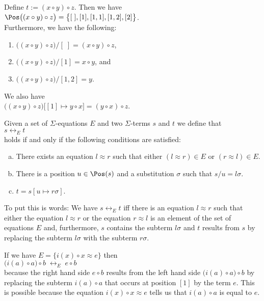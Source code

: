 \example
Define $t := (x \circ y) \circ z$.  Then we have
\\[0.2cm]
\hspace*{1.3cm}
$\Pos\bigl((x \circ y) \circ z\bigr) = \bigl\{ [\;], [1], [1,1], [1,2], [2]\bigr\}$.
\\[0.2cm]
Furthermore, we have the following:
\begin{enumerate}

\item $\bigl((x \circ y) \circ z\bigr)/[\;] = (x \circ y) \circ z$,
\item $\bigl((x \circ y) \circ z\bigr)/[1] = x \circ y$, and
\item $\bigl((x \circ y) \circ z\bigr)/[1,2] = y$.
\end{enumerate}
We also have
\\[0.2cm]
\hspace*{1.3cm}
$\bigl((x \circ y) \circ z\bigr)\bigl[[1] \mapsto y \circ x\bigr] = (y \circ x) \circ z$. \eox

\begin{Definition}[$\leftrightarrow_E$]
  Given a set of $\Sigma$-equations $E$ and two $\Sigma$-terms $s$ and $t$ we define that
  \\[0.2cm]
  \hspace*{1.3cm}
  $s \leftrightarrow_E t$
  \\[0.2cm]
  holds if and only if the following conditions are satisfied:
  \begin{enumerate}[(a)]
  \item There exists an equation $l \approx r$  such that either $(l \approx r) \in E$ or $(r \approx l) \in  E$.
  \item There is a position $u \in \Pos(s)$ and a substitution $\sigma$ such that $s/u = l\sigma$.
  \item $t = s[u \mapsto r\sigma]$. \eox
  \end{enumerate}
\end{Definition}
To put this is words: We have $s \leftrightarrow_E t$ iff there is an equation $l \approx r$ such that
either the equation $l \approx r$ or the equation $r \approx l$ is an element of the set of equations $E$ and,
furthermore, $s$ contains the subterm $l\sigma$ and $t$ results from $s$ by replacing the subterm $l\sigma$
with the subterm $r\sigma$. 

\example
If we have $E = \bigl\{ i(x) \circ x \approx e \bigr\}$ then
\\[0.2cm]
\hspace*{1.3cm}
$\bigl(i(a) \circ a\bigr) \circ b \;\leftrightarrow_E\; e \circ b$
\\[0.2cm]
because the right hand side $e \circ b$ results from the left hand side $\bigl(i(a) \circ a\bigr) \circ b$ by
replacing the subterm $i(a) \circ a$ that occurs at position $[1]$ by the term $e$.
This is possible because the equation $i(x) \circ x \approx e$ tells us that $i(a) \circ a$ is equal to $e$.
\eod

